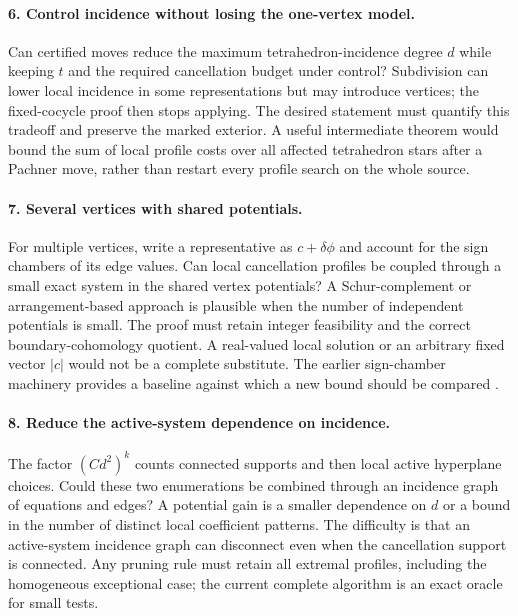 \paragraph{6. Control incidence without losing the one-vertex model.}
Can certified moves reduce the maximum tetrahedron-incidence degree $d$ while
keeping $t$ and the required cancellation budget under control? Subdivision
can lower local incidence in some representations but may introduce vertices;
the fixed-cocycle proof then stops applying. The desired statement must
quantify this tradeoff and preserve the marked exterior. A useful intermediate
theorem would bound the sum of local profile costs over all affected
tetrahedron stars after a Pachner move, rather than restart every profile
search on the whole source.

\paragraph{7. Several vertices with shared potentials.}
For multiple vertices, write a representative as $c+\delta\phi$ and account
for the sign chambers of its edge values. Can local cancellation profiles be
coupled through a small exact system in the shared vertex potentials? A
Schur-complement or arrangement-based approach is plausible when the number
of independent potentials is small. The proof must retain integer feasibility
and the correct boundary-cohomology quotient. A real-valued local solution or
an arbitrary fixed vector $|c|$ would not be a complete substitute. The earlier
sign-chamber machinery provides a baseline against which a new bound should
be compared \cite{incoming-cancellation}.

\paragraph{8. Reduce the active-system dependence on incidence.}
The factor $(Cd^2)^k$ counts connected supports and then local active
hyperplane choices. Could these two enumerations be combined through an
incidence graph of equations and edges? A potential gain is a smaller
dependence on $d$ or a bound in the number of distinct local coefficient
patterns. The difficulty is that an active-system incidence graph can
disconnect even when the cancellation support is connected. Any pruning rule
must retain all extremal profiles, including the homogeneous exceptional
case; the current complete algorithm is an exact oracle for small tests.

